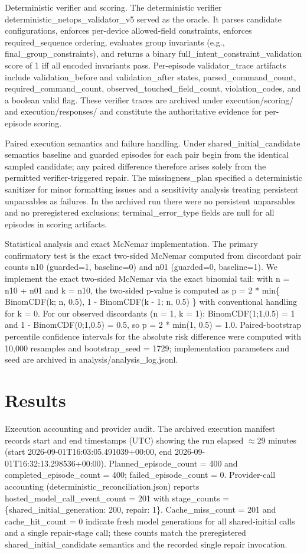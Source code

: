 \documentclass[conference]{IEEEtran}
\begin{document}
Deterministic verifier and scoring. The deterministic verifier deterministic\_netops\_validator\_v5 served as the oracle. It parses candidate configurations, enforces per-device allowed-field constraints, enforces required\_sequence ordering, evaluates group invariants (e.g., final\_group\_constraints), and returns a binary full\_intent\_constraint\_validation score of 1 iff all encoded invariants pass. Per-episode validator\_trace artifacts include validation\_before and validation\_after states, parsed\_command\_count, required\_command\_count, observed\_touched\_field\_count, violation\_codes, and a boolean valid flag. These verifier traces are archived under execution/scoring/ and execution/responses/ and constitute the authoritative evidence for per-episode scoring.

Paired execution semantics and failure handling. Under shared\_initial\_candidate semantics baseline and guarded episodes for each pair begin from the identical sampled candidate; any paired difference therefore arises solely from the permitted verifier-triggered repair. The missingness\_plan specified a deterministic sanitizer for minor formatting issues and a sensitivity analysis treating persistent unparsables as failures. In the archived run there were no persistent unparsables and no preregistered exclusions; terminal\_error\_type fields are null for all episodes in scoring artifacts.

Statistical analysis and exact McNemar implementation. The primary confirmatory test is the exact two-sided McNemar computed from discordant pair counts n10 (guarded=1, baseline=0) and n01 (guarded=0, baseline=1). We implement the exact two-sided McNemar via the exact binomial tail: with n = n10 + n01 and k = n10, the two-sided p-value is computed as
p = 2 * min\{ BinomCDF(k; n, 0.5), 1 - BinomCDF(k - 1; n, 0.5) \}
with conventional handling for k = 0. For our observed discordants (n = 1, k = 1): BinomCDF(1;1,0.5) = 1 and 1 - BinomCDF(0;1,0.5) = 0.5, so p = 2 * min(1, 0.5) = 1.0. Paired-bootstrap percentile confidence intervals for the absolute risk difference were computed with 10,000 resamples and bootstrap\_seed = 1729; implementation parameters and seed are archived in analysis/analysis\_log.jsonl.

\section{Results}
Execution accounting and provider audit. The archived execution manifest records start and end timestamps (UTC) showing the run elapsed \ensuremath{\approx}29 minutes (start 2026-09-01T16:03:05.491039+00:00, end 2026-09-01T16:32:13.298536+00:00). Planned\_episode\_count = 400 and completed\_episode\_count = 400; failed\_episode\_count = 0. Provider-call accounting (deterministic\_reconciliation.json) reports hosted\_model\_call\_event\_count = 201 with stage\_counts = \{shared\_initial\_generation: 200, repair: 1\}. Cache\_miss\_count = 201 and cache\_hit\_count = 0 indicate fresh model generations for all shared-initial calls and a single repair-stage call; these counts match the preregistered shared\_initial\_candidate semantics and the recorded single repair invocation.
\end{document}
